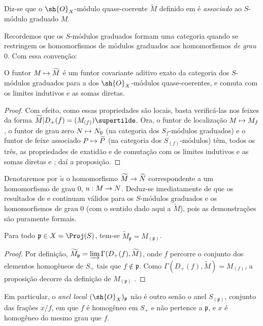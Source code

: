 \documentclass[oneside,10pt]{amsart}
\makeatletter
\newcommand{\ega@arrow}[2]{\mathchoice{#1}{#2}{#2}{#2}}
\let\ega@shortmapsto\mapsto
\renewcommand{\to}{\ega@arrow{\longrightarrow}{\rightarrow}}
\renewcommand{\mapsto}{\ega@arrow{\longmapsto}{\ega@shortmapsto}}
\newcommand{\oldpage}[2][]{\marginnote{\normalfont\footnotesize\textbf{#1}~|~#2}\ignorespaces}
\let\EGAOriginalLabel\label
\renewcommand{\label}[1]{\phantomsection\EGAOriginalLabel{#1}}
\makeatother
\begin{document}
\begin{definition}[2.5.3]
\label{II.2.5.3}
Diz-se que o $\sh{O}_X$-módulo quase-coerente $\widetilde{M}$ definido em  é \emph{associado} ao $S$-módulo graduado $M$.
\end{definition}

Recordemos que os $S$-módulos graduados formam uma categoria quando se restringem os homomorfismos de módulos graduados aos homomorfismos \emph{de grau $0$}.
Com essa convenção:

\begin{proposition}[2.5.4]
\label{II.2.5.4}
O funtor $M\mapsto\widetilde{M}$ é um funtor covariante aditivo exato da categoria dos $S$-módulos graduados para a dos $\sh{O}_X$-módulos quase-coerentes, e comuta com os limites indutivos e as somas diretas.
\end{proposition}

\begin{proof}
Com efeito, como essas propriedades são locais, basta verificá-las nos feixes da forma $\widetilde{M}|D_+(f)=(M_{(f)})\supertilde$.
Ora, o funtor de localização $M\mapsto M_f$, o funtor de grau zero $N\mapsto N_0$ (na categoria dos $S_f$-módulos graduados) e o funtor de feixe associado $P\mapsto\widetilde{P}$ (na categoria dos $S_{(f)}$-módulos) têm, todos os três, as propriedades de exatidão e de comutação com os limites indutivos e as somas diretas  e ; daí a proposição.
\end{proof}

Denotaremos por $\widetilde{u}$ o homomorfismo $\widetilde{M}\to\widetilde{N}$ correspondente a um homomorfismo de grau $0$, $u:M\to N$.
Deduz-se imediatamente de  que os resultados de  e  continuam válidos para os $S$-módulos graduados e os homomorfismos de grau $0$ (com o sentido dado aqui a $\widetilde{M}$), pois as demonstrações são puramente formais.

\begin{proposition}[2.5.5]
\label{II.2.5.5}
Para todo $\mathfrak{p}\in X=\Proj(S)$, tem-se $\widetilde{M}_\mathfrak{p}=M_{(\mathfrak{p})}$.
\end{proposition}

\begin{proof}
Por definição, $\widetilde{M}_\mathfrak{p}=\varinjlim\Gamma(D_+(f),\widetilde{M})$, onde $f$ percorre o conjunto dos elementos homogêneos de $S_+$ tais que $f\notin\mathfrak{p}$.
Como $\Gamma(D_+(f),\widetilde{M})=M_{(f)}$, a proposição decorre da definição de $M_{(\mathfrak{p})}$ .
\end{proof}
\oldpage[II]{32}
Em particular, o \emph{anel local $(\sh{O}_X)_\mathfrak{p}$} não é outro senão o anel $S_{(\mathfrak{p})}$, conjunto das frações $x/f$, em que $f$ é homogêneo em $S_+$ e não pertence a $\mathfrak{p}$, e $x$ é homogêneo do mesmo grau que $f$.
\end{document}
